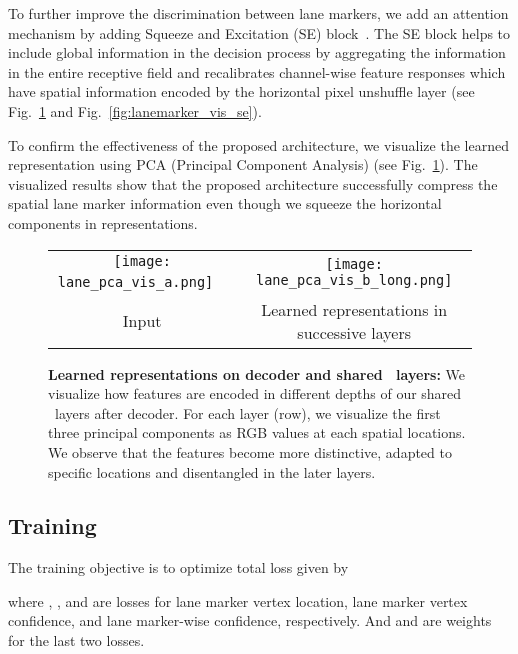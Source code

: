 \documentclass[10pt,twocolumn,letterpaper]{article}
\begin{document}
To further improve the discrimination between lane markers, we add an attention mechanism by adding Squeeze and Excitation (SE) block~\cite{SEBlock}. The SE block helps to include global information in the decision process by aggregating the information in the entire receptive field and recalibrates channel-wise feature responses which have spatial information encoded by the horizontal pixel unshuffle layer (see Fig.~\ref{fig:lanemarker_vis} and Fig.~\ref{fig:lanemarker_vis_se}).

To confirm the effectiveness of the proposed architecture, we visualize the learned representation using PCA (Principal Component Analysis) (see Fig.~\ref{fig:lanemarker_vis}). The visualized results show that the proposed architecture successfully compress the spatial lane marker information even though we squeeze the horizontal components in representations.

\begin{figure}[t]
	\small
	\begin{center}
		\begin{tabular}{@{}c@{}c@{}}
			\texttt{[image: lane\_pca\_vis\_a.png]} \ & \hspace{.5pt}
			\texttt{[image: lane\_pca\_vis\_b\_long.png]} \\
			Input & Learned representations in successive layers
		\end{tabular} 
	\end{center} 
	\caption{\textbf{Learned representations on decoder and shared \reductionname\ layers:} We visualize how features are encoded in different depths of our shared \reductionname\ layers after decoder. For each layer (row), we visualize the first three principal components as RGB values at each spatial locations. We observe that the features become more distinctive, adapted to specific locations and disentangled in the later layers.}
	\label{fig:lanemarker_vis} 
	\vspace{-5.5px}
\end{figure}

\subsection{Training}
The training objective is to optimize total loss  given by

where , , and  are losses for lane marker vertex location, lane marker vertex confidence, and lane marker-wise confidence, respectively. And  and   are weights for the last two losses. 
\end{document}
